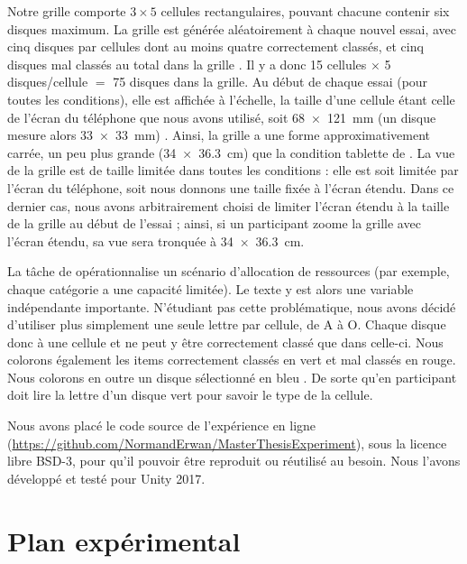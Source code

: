 Notre grille comporte $3 \times 5$ cellules rectangulaires, pouvant chacune contenir six disques maximum. La grille est générée aléatoirement à chaque nouvel essai, avec cinq disques par cellules dont au moins quatre correctement classés, et cinq disques mal classés au total dans la grille . Il y a donc 15 cellules $\times$ 5 disques/cellule $=$ 75 disques dans la grille. Au début de chaque essai (pour toutes les conditions), elle est affichée à l'échelle, la taille d'une cellule étant celle de l'écran du téléphone que nous avons utilisé, soit \SI{68x121}{\mm} (un disque mesure alors \SI{33x33}{\mm}) . Ainsi, la grille a une forme approximativement carrée, un peu plus grande (\SI{34x36.3}{\cm}) que la condition tablette de \cite{Raedle2014}. La vue de la grille est de taille limitée dans toutes les conditions : elle est soit limitée par l'écran du téléphone, soit nous donnons une taille fixée à l'écran étendu. Dans ce dernier cas, nous avons arbitrairement choisi de limiter l'écran étendu à la taille de la grille au début de l'essai ; ainsi, si un participant zoome la grille avec l'écran étendu, sa vue sera tronquée à \SI{34x36.3}{\cm}.


La tâche de \cite{Liu2014} opérationnalise un scénario d'allocation de ressources (par exemple, chaque catégorie a une capacité limitée). Le texte y est alors une variable indépendante importante. N'étudiant pas cette problématique, nous avons décidé d'utiliser plus simplement une seule lettre par cellule, de A à O. Chaque disque  donc à une cellule et ne peut y être correctement classé que dans celle-ci. Nous colorons également les items correctement classés en vert et mal classés en rouge. Nous colorons en outre un disque sélectionné en bleu . De sorte qu'en participant doit lire la lettre d'un disque vert pour savoir le type de la cellule.

Nous avons placé le code source de l'expérience en ligne (\url{https://github.com/NormandErwan/MasterThesisExperiment}), sous la licence libre BSD-3, pour qu'il pouvoir être reproduit ou réutilisé au besoin. Nous l'avons développé et testé pour Unity 2017.


\section{Plan expérimental}
\label{sec:experiment_design}

